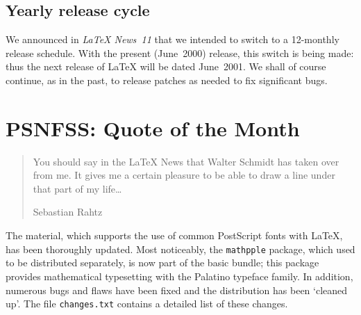 \documentclass{ltnews}
\providecommand\pkg[1]{\texttt{#1}}
\providecommand\file[1]{\texttt{#1}}
\begin{document}
\maketitle

\raisefirstsection
\subsection{Yearly release cycle}

We announced in \textit{\LaTeX{} News~11} that we intended to switch
to a 12-monthly release schedule.  With the present (June~2000)
release, this switch is being made: thus the next release of \LaTeX{}
will be dated June~2001.  We shall of course continue, as in the past,
to release patches as needed to fix significant bugs.

  \begin{latexonly}
    \vspace{-0.2\baselineskip}
    \enlargethispage{\baselineskip}
  \end{latexonly}

\section{PSNFSS: \small Quote of the Month}

\begin{quote}
  You should say in the \LaTeX{} News that Walter Schmidt has taken over
  \PSNFSS{} from me. It gives me a certain pleasure to be able to draw a
  line under that part of my life\ldots

  \begin{latexonly}
    \vspace{-\baselineskip}
  \end{latexonly}

  \begin{flushright}
    Sebastian Rahtz
  \end{flushright}
\end{quote}

\begin{latexonly}
  \vspace{-\baselineskip}
\end{latexonly}

\noindent
The \PSNFSS{} material, which supports the use\latex{\\}
of common PostScript fonts with \LaTeX{}, has been thoroughly updated.
Most noticeably, the \pkg{mathpple} package, which used to be
distributed separately, is now part of the basic \PSNFSS{} bundle;
this package provides mathematical typesetting with the Palatino
typeface family.  In addition, numerous bugs and flaws have been fixed
and the distribution has been `cleaned up'.  The file
\file{changes.txt} contains a detailed list of these changes.
\end{document}
